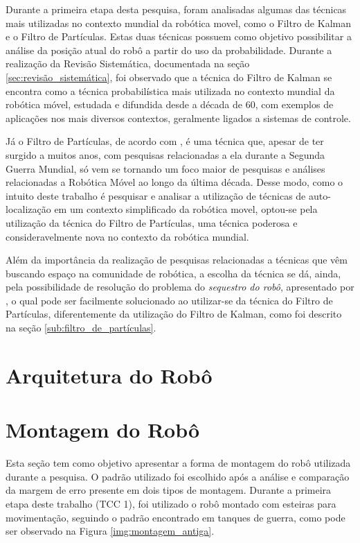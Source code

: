 	Durante a primeira etapa desta pesquisa, foram analisadas algumas das técnicas mais utilizadas no contexto mundial da robótica movel, como o Filtro de Kalman e
	o Filtro de Partículas. Estas duas técnicas possuem como objetivo possibilitar a análise da posição atual do robô a partir do uso da probabilidade. Durante a realização
	da Revisão Sistemática, documentada na seção \ref{sec:revisão_sistemática}, foi observado que a técnica do Filtro de Kalman se encontra
	como a técnica probabilística mais utilizada no contexto mundial da robótica móvel, estudada e difundida desde a década de 60, com exemplos de aplicações
	nos mais diversos contextos, geralmente ligados a sistemas de controle.

	Já o Filtro de Partículas, de acordo com \cite{sequestro}, é uma técnica que, apesar de ter surgido a muitos anos, com
	pesquisas relacionadas a ela durante a Segunda Guerra Mundial, só vem se tornando um foco maior de pesquisas e análises relacionadas
	a Robótica Móvel ao longo da última década. Desse modo, como o intuito deste trabalho é pesquisar e analisar a utilização de técnicas de auto-localização em um contexto
	simplificado da robótica movel, optou-se pela utilização da técnica do Filtro de Partículas, uma técnica poderosa e consideravelmente nova no contexto da
	robótica mundial.

	Além da importância da realização de pesquisas relacionadas a técnicas que vêm buscando espaço na comunidade de robótica, a escolha da técnica se dá, ainda,
	pela possibilidade de resolução do problema do \textit{sequestro do robô}, apresentado por \cite{sequestro}, o qual pode ser facilmente solucionado ao utilizar-se da técnica do
	Filtro de Partículas, diferentemente da utilização do Filtro de Kalman, como foi descrito na seção \ref{sub:filtro_de_partículas}.

\section{Arquitetura do Robô}


\section{Montagem do Robô}

	Esta seção tem como objetivo apresentar a forma de montagem do robô utilizada durante a pesquisa. O padrão utilizado foi escolhido após a análise e comparação da margem de erro presente em dois tipos de montagem. Durante a primeira etapa deste trabalho (TCC 1), foi utilizado o robô montado com esteiras para movimentação, seguindo o padrão encontrado em tanques de guerra, como pode ser observado na Figura \ref{img:montagem_antiga}.

